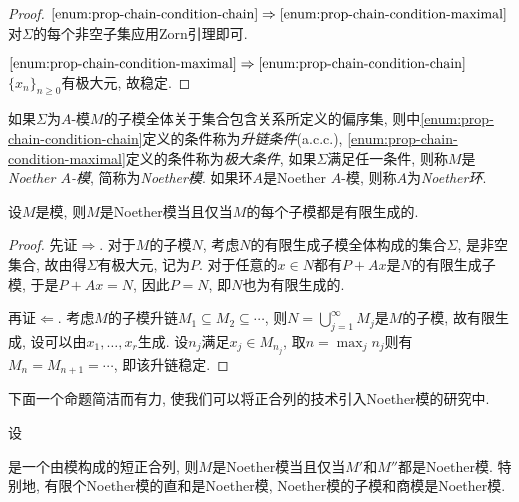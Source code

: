 \begin{proof}
  $\ref{enum:prop-chain-condition-chain}\Rightarrow\ref{enum:prop-chain-condition-maximal}$ 对$\Sigma$的每个非空子集应用Zorn引理即可.

  $\ref{enum:prop-chain-condition-maximal}\Rightarrow\ref{enum:prop-chain-condition-chain}$ $\{x_n\}_{n\geq 0}$有极大元, 故稳定.
\end{proof}

如果$\Sigma$为$A$-模$M$的子模全体关于集合包含关系所定义的偏序集, 则中\ref{enum:prop-chain-condition-chain}定义的条件称为\emph{升链条件}(a.c.c.), \ref{enum:prop-chain-condition-maximal}定义的条件称为\emph{极大条件}, 如果$\Sigma$满足任一条件, 则称$M$是\emph{Noether $A$-模}, 简称为\emph{Noether模}. 如果环$A$是Noether $A$-模, 则称$A$为\emph{Noether环}.

\begin{proposition}\label{prop:noethermodule}
  设$M$是模, 则$M$是Noether模当且仅当$M$的每个子模都是有限生成的.
\end{proposition}

\begin{proof}
  先证$\Rightarrow$. 对于$M$的子模$N$, 考虑$N$的有限生成子模全体构成的集合$\Sigma$, 是非空集合, 故由得$\Sigma$有极大元, 记为$P$. 对于任意的$x\in N$都有$P+Ax$是$N$的有限生成子模, 于是$P+Ax=N$, 因此$P=N$, 即$N$也为有限生成的.

  再证$\Leftarrow$. 考虑$M$的子模升链$M_1\subseteq M_2\subseteq \dotsb$, 则$N=\bigcup_{j=1}^\infty M_j$是$M$的子模, 故有限生成, 设可以由$x_1, \dotsc, x_r$生成. 设$n_j$满足$x_j\in M_{n_j}$, 取$n=\max_j n_j$则有$M_n=M_{n+1}=\dotsb$, 即该升链稳定.
\end{proof}

下面一个命题简洁而有力, 使我们可以将正合列的技术引入Noether模的研究中.

\begin{proposition}\label{prop:noethermoduleexactsequence}
  设
  是一个由模构成的短正合列, 则$M$是Noether模当且仅当$M'$和$M''$都是Noether模. 特别地, 有限个Noether模的直和是Noether模, Noether模的子模和商模是Noether模.
\end{proposition}

